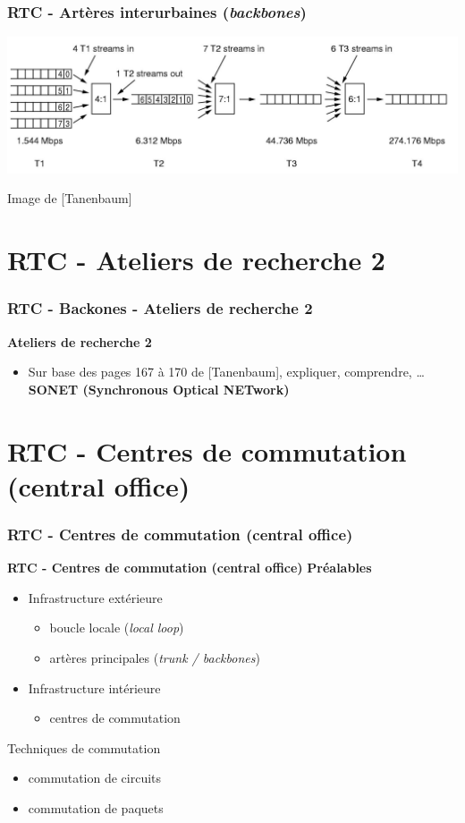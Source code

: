 \begin{frame}[fragile]
	\frametitle{RTC - Artères interurbaines (\textit{backbones})}
\begin{center}
	\includegraphics[width=.9\linewidth]{img/2-28-old.jpg}
	\par{\scriptsize Image de [Tanenbaum]} 
\end{center}
\end{frame}



\section{RTC - Ateliers de recherche 2}

\begin{frame}[fragile]
	\frametitle{RTC - Backones - Ateliers de recherche 2}
{\large\bf Ateliers de recherche 2} 
\begin{itemize}
	\item Sur base des pages 167 à 170 de [Tanenbaum], expliquer, comprendre, …
	\textbf{SONET (Synchronous Optical NETwork)}
\end{itemize}
\end{frame}



\section{RTC - Centres de commutation (central office)}

\begin{frame}[fragile]
  \frametitle{RTC - Centres de commutation (central office)}
{\Large\bf RTC - Centres de commutation (central office)}
{\large\bf Préalables}
\begin{itemize}
	\item Infrastructure extérieure
	\begin{itemize}
		\item boucle locale (\textit{local loop})
		\item artères principales (\textit{trunk / backbones})
	\end{itemize}
	\item Infrastructure intérieure
	\begin{itemize}
		\item centres de commutation
	\end{itemize}
\end{itemize}
\vspace{.5cm}
Techniques de commutation
\begin{itemize}
	\item commutation de circuits
	\item commutation de paquets
\end{itemize}
\end{frame}


